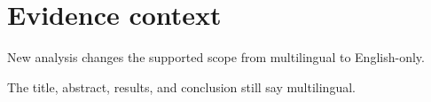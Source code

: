 \section{Evidence context}
New analysis changes the supported scope from multilingual to English-only.

The title, abstract, results, and conclusion still say multilingual.
